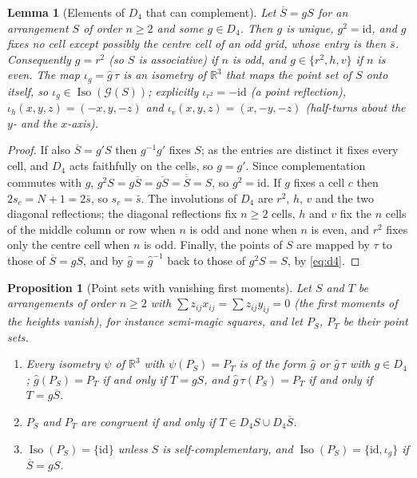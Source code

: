 \documentclass[11pt,a4paper]{article}
\theoremstyle{plain}
\newtheorem{lemma}[theorem]{Lemma}
\newtheorem{proposition}[theorem]{Proposition}
\theoremstyle{definition}
\theoremstyle{remark}
\newcommand{\R}{\mathbb{R}}
\begin{document}
\begin{lemma}[Elements of $D_4$ that can complement]
\label{lem:selfcomp}
Let $\overline S=gS$ for an arrangement $S$ of order $n\ge2$ and some $g\in D_4$. Then $g$ is unique, $g^2=\mathrm{id}$, and $g$ fixes no cell except possibly the centre cell of an odd grid, whose entry is then $\bar s$.
Consequently $g=r^2$ (so $S$ is associative) if $n$ is odd, and $g\in\{r^2,h,v\}$ if $n$ is even.
The map $\iota_g=\hat g\,\tau$ is an isometry of $\R^3$ that maps the point set of $S$ onto itself, so $\iota_g\in\operatorname{Iso}(\mathcal G(S))$; explicitly $\iota_{r^2}=-\mathrm{id}$ (a point reflection), $\iota_h(x,y,z)=(-x,y,-z)$ and $\iota_v(x,y,z)=(x,-y,-z)$ (half-turns about the $y$- and the $x$-axis).
\end{lemma}

\begin{proof}
If also $\overline S=g'S$ then $g^{-1}g'$ fixes $S$; as the entries are distinct it fixes every cell, and $D_4$ acts faithfully on the cells, so $g=g'$.
Since complementation commutes with $g$, $g^2S=g\overline S=\overline{gS}=\overline{\overline S}=S$, so $g^2=\mathrm{id}$.
If $g$ fixes a cell $c$ then $2s_c=N+1=2\bar s$, so $s_c=\bar s$.
The involutions of $D_4$ are $r^2$, $h$, $v$ and the two diagonal reflections; the diagonal reflections fix $n\ge2$ cells, $h$ and $v$ fix the $n$ cells of the middle column or row when $n$ is odd and none when $n$ is even, and $r^2$ fixes only the centre cell when $n$ is odd.
Finally, the points of $S$ are mapped by $\tau$ to those of $\overline S=gS$, and by $\hat g=\hat g^{-1}$ back to those of $g^2S=S$, by \eqref{eq:d4}.
\end{proof}

\begin{proposition}[Point sets with vanishing first moments]
\label{prop:pointset}
Let $S$ and $T$ be arrangements of order $n\ge2$ with $\sum z_{ij}x_{ij}=\sum z_{ij}y_{ij}=0$ (the first moments of the heights vanish), for instance semi-magic squares, and let $P_S$, $P_T$ be their point sets.
\begin{enumerate}
\item Every isometry $\psi$ of $\R^3$ with $\psi(P_S)=P_T$ is of the form $\hat g$ or $\hat g\,\tau$ with $g\in D_4$; $\hat g(P_S)=P_T$ if and only if $T=gS$, and $\hat g\,\tau(P_S)=P_T$ if and only if $T=g\overline S$.
\item $P_S$ and $P_T$ are congruent if and only if $T\in D_4S\cup D_4\overline S$.
\item $\operatorname{Iso}(P_S)=\{\mathrm{id}\}$ unless $S$ is self-complementary, and $\operatorname{Iso}(P_S)=\{\mathrm{id},\iota_g\}$ if $\overline S=gS$.
\end{enumerate}
\end{proposition}
\end{document}
